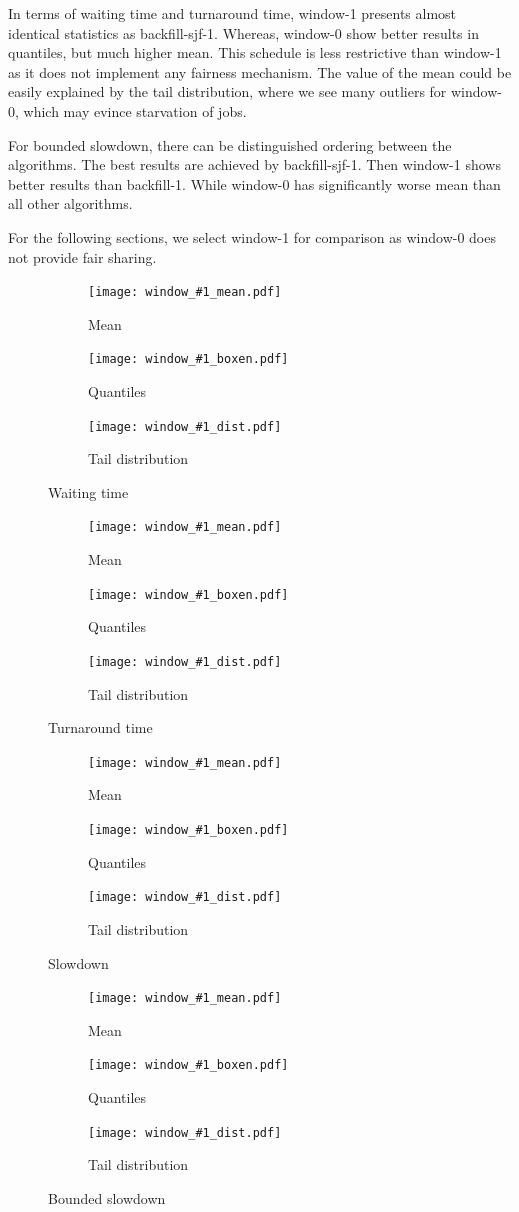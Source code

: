 \documentclass[thesis-en.tex]{subfiles}
\newcommand{\sfigw}{0.325}
\newcommand{\windowplot}[2]{
\begin{figure}[hp]
  \begin{subfigure}{\sfigw\linewidth}
    \centering
    \texttt{[image: window\_\#1\_mean.pdf]} 
    \caption{Mean} 
    \label{fig:window_#1_mean} 
  \end{subfigure}
  \hfill
  \begin{subfigure}{\sfigw\linewidth}
    \centering
    \texttt{[image: window\_\#1\_boxen.pdf]}
    \caption{Quantiles}
    \label{fig:window_#1_boxen}
  \end{subfigure}
  \hfill
  \begin{subfigure}{\sfigw\linewidth}
    \centering
    \texttt{[image: window\_\#1\_dist.pdf]}
    \caption{Tail distribution} 
    \label{fig:window_#1_dist} 
  \end{subfigure}
  \caption{#2}
  \label{fig:window_#1} 
\end{figure}
}
\begin{document}
In terms of waiting time and turnaround time, window-1 presents almost identical statistics as backfill-sjf-1. Whereas, window-0 show better results in quantiles, but much higher mean. This schedule is less restrictive than window-1 as it does not implement any fairness mechanism. The value of the mean could be easily explained by the tail distribution, where we see many outliers for window-0, which may evince starvation of jobs.

For bounded slowdown, there can be distinguished ordering between the algorithms. 
The best results are achieved by backfill-sjf-1. Then window-1 shows better results than backfill-1. While window-0 has significantly worse mean than all other algorithms.

For the following sections, we select window-1 for comparison as window-0 does not provide fair sharing.

\windowplot{waiting-time}{Waiting time}

\windowplot{turnaround-time}{Turnaround time}
\windowplot{slowdown}{Slowdown}
\windowplot{bounded-slowdown}{Bounded slowdown}

\FloatBarrier
\end{document}
